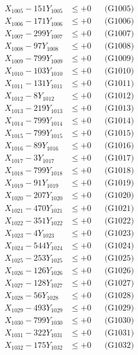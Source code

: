 \documentclass[a4paper,10pt]{article}
\begin{document}
{\begin{align}
X_{1005} - 151Y_{1005} &\leq +0 && \text{(G1005)} \\
X_{1006} - 171Y_{1006} &\leq +0 && \text{(G1006)} \\
X_{1007} - 299Y_{1007} &\leq +0 && \text{(G1007)} \\
X_{1008} - 97Y_{1008} &\leq +0 && \text{(G1008)} \\
X_{1009} - 799Y_{1009} &\leq +0 && \text{(G1009)} \\
X_{1010} - 103Y_{1010} &\leq +0 && \text{(G1010)} \\
\allowbreak
X_{1011} - 131Y_{1011} &\leq +0 && \text{(G1011)} \\
X_{1012} - 8Y_{1012} &\leq +0 && \text{(G1012)} \\
X_{1013} - 219Y_{1013} &\leq +0 && \text{(G1013)} \\
X_{1014} - 799Y_{1014} &\leq +0 && \text{(G1014)} \\
X_{1015} - 799Y_{1015} &\leq +0 && \text{(G1015)} \\
X_{1016} - 89Y_{1016} &\leq +0 && \text{(G1016)} \\
X_{1017} - 3Y_{1017} &\leq +0 && \text{(G1017)} \\
X_{1018} - 799Y_{1018} &\leq +0 && \text{(G1018)} \\
X_{1019} - 91Y_{1019} &\leq +0 && \text{(G1019)} \\
X_{1020} - 207Y_{1020} &\leq +0 && \text{(G1020)} \\
\allowbreak
X_{1021} - 470Y_{1021} &\leq +0 && \text{(G1021)} \\
X_{1022} - 351Y_{1022} &\leq +0 && \text{(G1022)} \\
X_{1023} - 4Y_{1023} &\leq +0 && \text{(G1023)} \\
X_{1024} - 544Y_{1024} &\leq +0 && \text{(G1024)} \\
X_{1025} - 253Y_{1025} &\leq +0 && \text{(G1025)} \\
X_{1026} - 126Y_{1026} &\leq +0 && \text{(G1026)} \\
X_{1027} - 128Y_{1027} &\leq +0 && \text{(G1027)} \\
X_{1028} - 56Y_{1028} &\leq +0 && \text{(G1028)} \\
X_{1029} - 493Y_{1029} &\leq +0 && \text{(G1029)} \\
X_{1030} - 799Y_{1030} &\leq +0 && \text{(G1030)} \\
\allowbreak
X_{1031} - 322Y_{1031} &\leq +0 && \text{(G1031)} \\
X_{1032} - 175Y_{1032} &\leq +0 && \text{(G1032)} \\

\end{align}}
\end{document}
